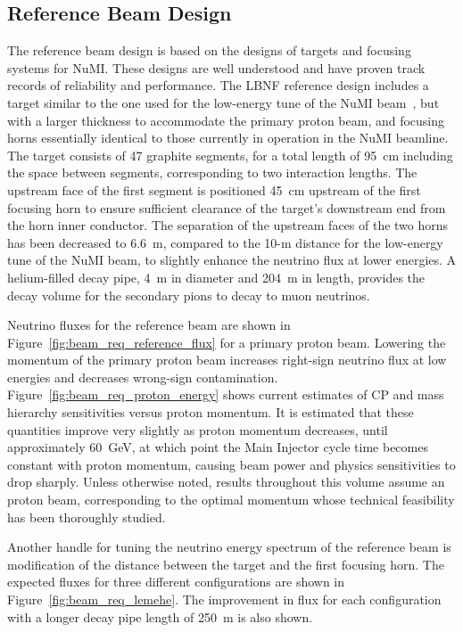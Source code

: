 \subsection{Reference Beam Design}
\label{sec:reference-design-focusing-system}
The reference beam design is based on the designs of targets and
focusing systems for NuMI. These designs are well understood and have
proven track records of reliability and performance. The LBNF
reference design includes a target similar to the one used for the
low-energy tune of the NuMI beam~\cite{Anderson:1998zza},  but with a larger
thickness to accommodate the  primary proton beam, and focusing
horns essentially identical to those currently in operation in the
NuMI beamline. %
The target consists of 47 graphite
segments, for a total length of 95~cm including the space between
segments, corresponding to two interaction lengths. The upstream face
of the first segment is positioned 45~cm upstream of the first
focusing horn to ensure sufficient clearance of the target's
downstream end from the horn inner conductor. The separation of the
upstream faces of the two horns has been decreased to 6.6~m, compared
to the 10-m distance for the low-energy tune of the NuMI beam, to
slightly enhance the neutrino flux at lower energies. A helium-filled
decay pipe, 4~m in diameter and 204~m in length, provides the decay
volume for the secondary pions to decay to muon neutrinos.

Neutrino fluxes for the reference beam are shown in
Figure~\ref{fig:beam_req_reference_flux} for a  primary proton
beam.  Lowering the momentum of the primary proton beam increases
right-sign neutrino flux at low energies and decreases wrong-sign
contamination.  Figure~\ref{fig:beam_req_proton_energy} shows current
estimates of CP and mass hierarchy sensitivities versus proton
momentum. It is estimated that these quantities improve very slightly as
proton momentum decreases, until approximately 60~GeV, at which point the Main
Injector cycle time becomes constant with proton momentum, causing
beam power and physics sensitivities to drop sharply.  Unless
otherwise noted, results throughout this volume assume an 
proton beam, corresponding to the optimal momentum whose technical
feasibility has been thoroughly studied.

Another handle for tuning the neutrino energy
spectrum of the reference beam is modification of the distance between
the target and the first focusing horn.  The expected fluxes for three
different configurations are shown in
Figure~\ref{fig:beam_req_lemehe}. The improvement in flux for each configuration with a longer decay pipe length of 250~m is also shown.

